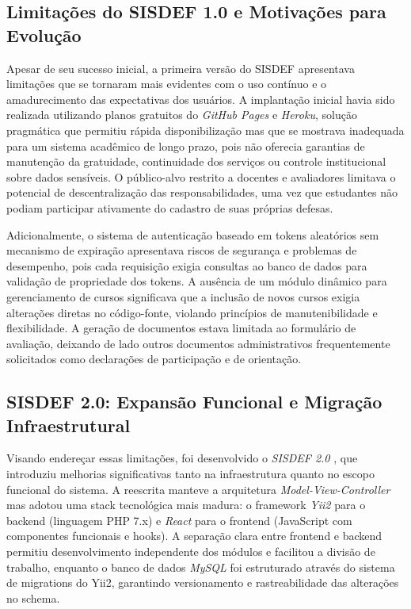 \documentclass[nonacm, sigconf]{acmart}
\begin{document}
\subsection{Limitações do SISDEF 1.0 e Motivações para Evolução}

Apesar de seu sucesso inicial, a primeira versão do SISDEF apresentava limitações que se tornaram mais evidentes com o uso contínuo e o amadurecimento das expectativas dos usuários. A implantação inicial havia sido realizada utilizando planos gratuitos do \textit{GitHub Pages} e \textit{Heroku}, solução pragmática que permitiu rápida disponibilização mas que se mostrava inadequada para um sistema acadêmico de longo prazo, pois não oferecia garantias de manutenção da gratuidade, continuidade dos serviços ou controle institucional sobre dados sensíveis. O público-alvo restrito a docentes e avaliadores limitava o potencial de descentralização das responsabilidades, uma vez que estudantes não podiam participar ativamente do cadastro de suas próprias defesas.

Adicionalmente, o sistema de autenticação baseado em tokens aleatórios sem mecanismo de expiração apresentava riscos de segurança e problemas de desempenho, pois cada requisição exigia consultas ao banco de dados para validação de propriedade dos tokens. A ausência de um módulo dinâmico para gerenciamento de cursos significava que a inclusão de novos cursos exigia alterações diretas no código-fonte, violando princípios de manutenibilidade e flexibilidade. A geração de documentos estava limitada ao formulário de avaliação, deixando de lado outros documentos administrativos frequentemente solicitados como declarações de participação e de orientação.

\subsection{SISDEF 2.0: Expansão Funcional e Migração Infraestrutural}

Visando endereçar essas limitações, foi desenvolvido o \textit{SISDEF 2.0} \cite{sisdef2}, que introduziu melhorias significativas tanto na infraestrutura quanto no escopo funcional do sistema. A reescrita manteve a arquitetura \textit{Model-View-Controller} mas adotou uma stack tecnológica mais madura: o framework \textit{Yii2} para o backend (linguagem PHP 7.x) e \textit{React} para o frontend (JavaScript com componentes funcionais e hooks). A separação clara entre frontend e backend permitiu desenvolvimento independente dos módulos e facilitou a divisão de trabalho, enquanto o banco de dados \textit{MySQL} foi estruturado através do sistema de migrations do Yii2, garantindo versionamento e rastreabilidade das alterações no schema.
\end{document}
